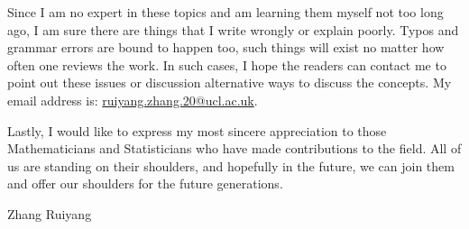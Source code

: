 \documentclass[11pt, a4paper, oneside]{book}
\theoremstyle{definition}
\begin{document}
\noindent Since I am no expert in these topics and am learning them myself not too long ago, I am sure there are things that I write wrongly or explain poorly. Typos and grammar errors are bound to happen too, such things will exist no matter how often one reviews the work. In such cases, I hope the readers can contact me to point out these issues or discussion alternative ways to discuss the concepts. My email address is: \href{"mailto:ruiyang.zhang.20@ucl.ac.uk"}{ruiyang.zhang.20@ucl.ac.uk}. 

\noindent Lastly, I would like to express my most sincere appreciation to those Mathematicians and Statisticians who have made contributions to the field. All of us are standing on their shoulders, and hopefully in the future, we can join them and offer our shoulders for the future generations. 

\null\hfill Zhang Ruiyang

\mainmatter

\backmatter
\end{document}
